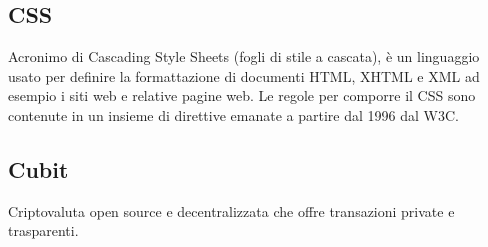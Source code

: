 \subsection{CSS}
Acronimo di Cascading Style Sheets (fogli di stile a cascata), è un linguaggio usato per definire la formattazione di documenti HTML, XHTML e XML ad esempio i siti web e relative pagine web. Le regole per comporre il CSS sono contenute in un insieme di direttive emanate a partire dal 1996 dal W3C.

\subsection{Cubit}
Criptovaluta open source e decentralizzata che offre transazioni private e trasparenti.
